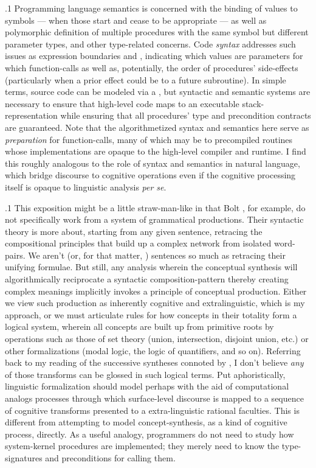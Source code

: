\documentclass[11pt, twocolumn]{article}
\begin{document}
\p.1{%
Programming language semantics is concerned with the binding
of values to symbols --- when those  start and
cease to be appropriate --- as well as polymorphic
definition of multiple procedures with the same symbol
but different parameter types, and other type-related
concerns.  Code \textit{syntax} addresses such issues as
expression boundaries and , indicating
which values are parameters for which function-calls as
well as, potentially, the order of procedures' side-effects
(particularly when a prior effect could be  to
a future subroutine).  In simple terms, source code
can be modeled via a , but syntactic and
semantic systems are necessary to ensure that high-level code
maps to an executable stack-representation while ensuring that
all procedures' type and precondition contracts are guaranteed.
Note that the algorithmetized syntax and semantics here
serve as \textit{preparation} for function-calls, many of which
may be to precompiled routines whose implementations are
opaque to the high-level compiler and runtime.  I find this
roughly analogous to the role of syntax and semantics
in natural language, which bridge discourse to cognitive
operations even if the cognitive processing itself
is opaque to linguistic analysis \textit{per se}.
} %

\p.1{%
This exposition might be a little straw-man-like in that Bolt \etal{},
for example, do not specifically work from a system of grammatical
productions.  Their syntactic theory is more about, starting
from any given sentence, retracing the compositional principles
that build up a complex network from isolated word-pairs.
We aren't  (or, for that matter, ) sentences
so much as retracing their unifying formulae.  But still,
any analysis wherein the conceptual synthesis will algorithmically
reciprocate a syntactic composition-pattern \mdash{} thereby
creating complex meanings \mdash{} implicitly invokes a
principle of conceptual production.  Either we view such
production as inherently cognitive and extralinguistic, which is
my approach, or we must articulate rules for how concepts
in their totality form a logical system, wherein all concepts are
built up from primitive roots by operations such as
those of set theory (union, intersection, disjoint union, etc.)
or other formalizations (modal logic, the logic of quantifiers, and so on).
Referring back to my reading of the successive syntheses
connoted by , I don't believe
\textit{any} of those transforms can be glossed in such logical terms.
Put aphoristically, linguistic formalization should model
\mdash{} perhaps with the aid of computational analogs \mdash{} processes
through which surface-level discourse is mapped to a sequence
of cognitive transforms presented to a extra-linguistic
rational faculties.  This is different from attempting
to model concept-synthesis, as a kind of cognitive process,
directly.  As a useful analogy, programmers do not need to
study how system-kernel procedures are implemented; they merely
need to know the type-signatures and preconditions for calling them.
} %
\end{document}
